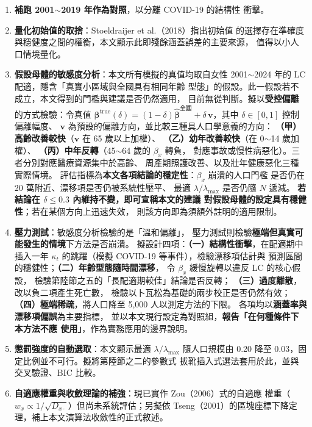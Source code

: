 \documentclass[UTF8, fontset=macnew, a4paper, 12pt]{ctexart}
\begin{document}
\begin{enumerate}[leftmargin=*]
  \item \textbf{補跑 2001$\sim$2019 年作為對照}，以分離 COVID-19 的結構性
        衝擊。
  \item \textbf{量化初始值的取捨}：Stoeldraijer et al.（2018）指出初始值
        的選擇存在準確度與穩健度之間的權衡，本文顯示此即殘餘涵蓋誤差的主要來源，
        值得以小人口情境量化。
  \item \textbf{假設母體的敏感度分析}：本文所有模擬的真值均取自女性
        2001$\sim$2024 年的 LC 配適，隱含「真實小區域與全國具有相同年齡
        型態」的假設。此一假設若不成立，本文得到的門檻與建議是否仍然適用，
        目前無從判斷。擬以\textbf{受控偏離}的方式檢驗：令真值
        $\boldsymbol{\beta}^{\text{true}}(\delta)
        =(1-\delta)\hat{\boldsymbol{\beta}}^{\text{全國}}
        +\delta\,\mathbf{v}$，其中 $\delta\in[0,1]$ 控制偏離幅度、
        $\mathbf{v}$ 為預設的偏離方向，並比較三種具人口學意義的方向：
        \textbf{（甲）高齡改善較快}（$\mathbf{v}$ 在 65 歲以上加權）、
        \textbf{（乙）幼年改善較快}（在 0$\sim$14 歲加權）、
        \textbf{（丙）中年反轉}（45$\sim$64 歲的 $\beta_x$ 轉負，
        對應事故或慢性病惡化）。三者分別對應醫療資源集中於高齡、
        周產期照護改善、以及壯年健康惡化三種實際情境。
        評估指標為\textbf{本文各項結論的穩定性}：$\beta_x$ 崩潰的人口門檻
        是否仍在 20 萬附近、漂移項是否仍被系統性壓平、
        最適 $\lambda/\lambda_{\max}$ 是否仍隨 $N$ 遞減。
        \textbf{若結論在 $\delta\le0.3$ 內維持不變，即可宣稱本文的建議
        對假設母體的設定具有穩健性}；若在某個方向上迅速失效，
        則該方向即為須額外註明的適用限制。
  \item \textbf{壓力測試}：敏感度分析檢驗的是「溫和偏離」，
        壓力測試則檢驗\textbf{極端但真實可能發生的情境}下方法是否崩潰。
        擬設計四項：\textbf{（一）結構性衝擊}，在配適期中插入一年
        $\kappa_t$ 的跳躍（模擬 COVID-19 等事件），檢驗漂移項估計與
        預測區間的穩健性；\textbf{（二）年齡型態隨時間漂移}，
        令 $\beta_x$ 緩慢旋轉以違反 LC 的核心假設，
        檢驗第陸節之五的「長配適期較佳」結論是否反轉；
        \textbf{（三）過度離散}，改以負二項產生死亡數，
        檢驗以卜瓦松為基礎的兩步校正是否仍然有效；
        \textbf{（四）極端稀疏}，將人口降至 5,000 人以測定方法的下限。
        各項均以\textbf{涵蓋率與漂移項偏誤}為主要指標，
        並以本文現行設定為對照組，\textbf{報告「在何種條件下本方法不應
        使用」}，作為實務應用的邊界說明。
  \item \textbf{懲罰強度的自動選取}：本文顯示最適 $\lambda/\lambda_{\max}$
        隨人口規模由 0.20 降至 0.03，固定比例並不可行。擬將第陸節之二的參數式
        拔靴插入式選法套用於此，並與交叉驗證、BIC 比較。
  \item \textbf{自適應權重與收斂理論的補強}：現已實作 Zou（2006）式的自適應
        權重（$w_x\propto1/\sqrt{D_{x\cdot}}$）但尚未系統評估；另擬依
        Tseng（2001）的區塊座標下降定理，補上本文演算法收斂性的正式敘述。
\end{enumerate}
\end{document}
